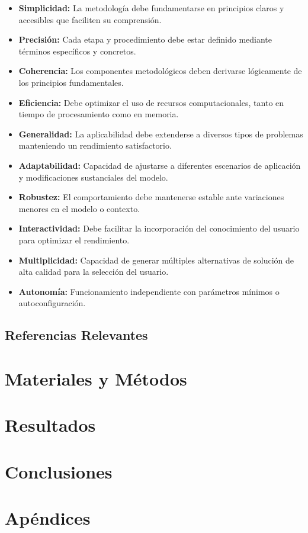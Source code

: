 \documentclass[12pt,titlepage,twoside,openright]{book}
\begin{document}
\begin{itemize}
	\item \textbf{Simplicidad:} La metodología debe fundamentarse en principios claros y accesibles que faciliten su comprensión.
	\item \textbf{Precisión:} Cada etapa y procedimiento debe estar definido mediante términos específicos y concretos.
	\item \textbf{Coherencia:} Los componentes metodológicos deben derivarse lógicamente de los principios fundamentales.
	\item \textbf{Eficiencia:} Debe optimizar el uso de recursos computacionales, tanto en tiempo de procesamiento como en memoria.
	\item \textbf{Generalidad:} La aplicabilidad debe extenderse a diversos tipos de problemas manteniendo un rendimiento satisfactorio.
	\item \textbf{Adaptabilidad:} Capacidad de ajustarse a diferentes escenarios de aplicación y modificaciones sustanciales del modelo.
	\item \textbf{Robustez:} El comportamiento debe mantenerse estable ante variaciones menores en el modelo o contexto.
	\item \textbf{Interactividad:} Debe facilitar la incorporación del conocimiento del usuario para optimizar el rendimiento.
	\item \textbf{Multiplicidad:} Capacidad de generar múltiples alternativas de solución de alta calidad para la selección del usuario.
	\item \textbf{Autonomía:} Funcionamiento independiente con parámetros mínimos o autoconfiguración.
\end{itemize}

\section{Referencias Relevantes}

\chapter{Materiales y Métodos}
\label{cap:materialesymetodos}

\chapter{Resultados}
\label{cap:resultados}

\chapter{Conclusiones}
\label{cap:conclusiones}

\backmatter




\appendix
\chapter{Apéndices}
\label{ap:apendices}
\end{document}
